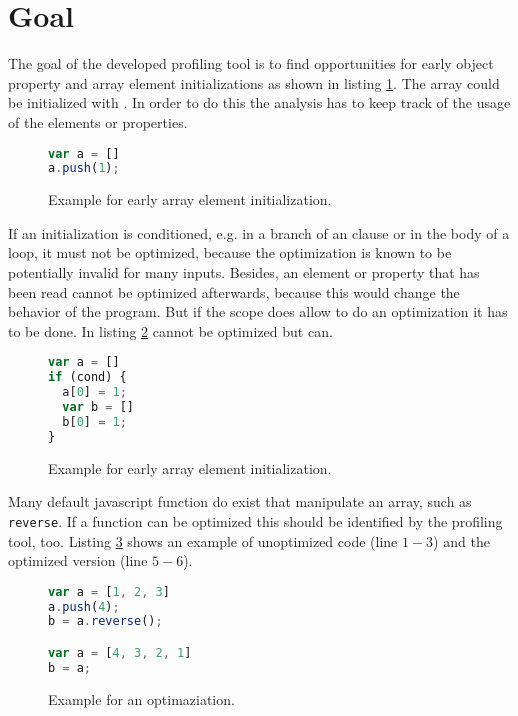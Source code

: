 \section{Goal}

The goal of the developed profiling tool is to find opportunities for early object property and array element initializations as shown in listing \ref{list:example1}. The array  could be initialized with \js{[1]}. In order to do this the analysis has to keep track of the usage of the elements or properties.

\begin{figure}[htbp]
\begin{lstlisting}[language=Javascript]
var a = []
a.push(1);
\end{lstlisting}
\caption{Example for early array element initialization.}\label{list:example1}
\end{figure}

If an initialization is conditioned, e.g. in a branch of an  clause or in the body of a loop, it must not be optimized, because the optimization is known to be potentially invalid for many inputs. Besides, an element or property that has been read cannot be optimized afterwards, because this would change the behavior of the program. But if the scope does allow to do an optimization it has to be done. In listing \ref{list:example4}  cannot be optimized but  can.

\begin{figure}[htbp]
\begin{lstlisting}[language=Javascript]
var a = []
if (cond) {
  a[0] = 1;
  var b = []
  b[0] = 1;
}
\end{lstlisting}
\caption{Example for early array element initialization.}\label{list:example4}
\end{figure}

Many default javascript function do exist that manipulate an array, such as \texttt{reverse}. If a function can be optimized this should be identified by the profiling tool, too. Listing \ref{list:example2} shows an example of unoptimized code (line $1-3$) and the optimized version (line $5-6$).

\begin{figure}[htbp]
\begin{lstlisting}[language=Javascript]
var a = [1, 2, 3]
a.push(4);
b = a.reverse();

var a = [4, 3, 2, 1]
b = a;
\end{lstlisting}
\caption{Example for an optimaziation.}\label{list:example2}
\end{figure}

